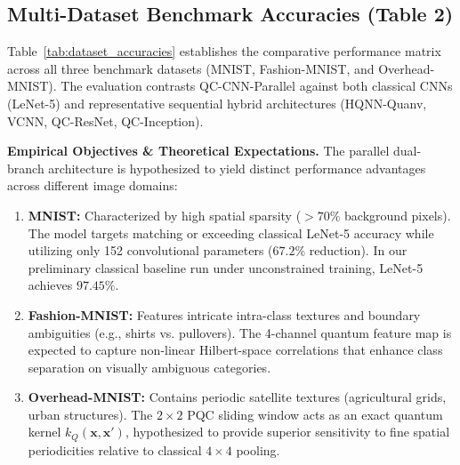 \documentclass[journal]{IEEEtran}
\begin{document}
\subsection{Multi-Dataset Benchmark Accuracies (Table 2)}
Table~\ref{tab:dataset_accuracies} establishes the comparative performance matrix across all three benchmark datasets (MNIST, Fashion-MNIST, and Overhead-MNIST). The evaluation contrasts QC-CNN-Parallel against both classical CNNs (LeNet-5) and representative sequential hybrid architectures (HQNN-Quanv, VCNN, QC-ResNet, QC-Inception).

\textbf{Empirical Objectives \& Theoretical Expectations.} 
The parallel dual-branch architecture is hypothesized to yield distinct performance advantages across different image domains:
\begin{enumerate}
    \item \textbf{MNIST:} Characterized by high spatial sparsity ($>70\%$ background pixels). The model targets matching or exceeding classical LeNet-5 accuracy while utilizing only 152 convolutional parameters ($67.2\%$ reduction). In our preliminary classical baseline run under unconstrained training, LeNet-5 achieves $97.45\%$.
    \item \textbf{Fashion-MNIST:} Features intricate intra-class textures and boundary ambiguities (e.g., shirts vs. pullovers). The 4-channel quantum feature map is expected to capture non-linear Hilbert-space correlations that enhance class separation on visually ambiguous categories.
    \item \textbf{Overhead-MNIST:} Contains periodic satellite textures (agricultural grids, urban structures). The $2 \times 2$ PQC sliding window acts as an exact quantum kernel $k_Q(\mathbf{x}, \mathbf{x}')$, hypothesized to provide superior sensitivity to fine spatial periodicities relative to classical $4 \times 4$ pooling.
\end{enumerate}
\end{document}
